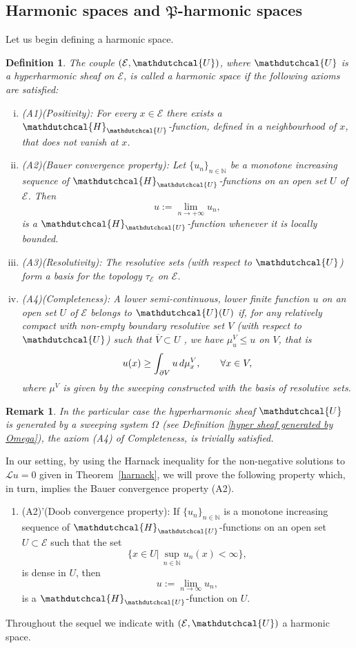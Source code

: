 \documentclass{amsart}
\newtheorem{defn}[thm]{Definition}
\newtheorem{rem}[thm]{Remark}
\numberwithin{equation}{section}
\def \Lc{{\mathcal{L}}}
\def \Hd{{\mathdutchcal{H}}}
\def \Ec{{\mathcal{E}}}
\def \Ud{{\mathdutchcal{U}}}
\begin{document}
{\subsection{Harmonic spaces and $\mathfrak{P}$-harmonic spaces}
Let us begin defining a harmonic space.
\begin{defn}
	\label{harmonic space}
The couple $(\Ec,\Ud)$, where $\Ud$ is a hyperharmonic sheaf on $\Ec$, is called a \textup{harmonic space} if the following axioms are satisfied:
\begin{enumerate}[(i)]
\item {\rm (A1)(Positivity):} For every $x\in \Ec$ there exists a $\Hd_{\Ud}$-function, defined in a neighbourhood of $x$, that does not vanish at $x$.
\item {\rm (A2)(Bauer convergence property):} Let $\{u_n\}_{n\in \mathbb{N}}$ be a monotone increasing sequence of $\Hd_{\Ud}$-functions on an open set $U$ of $\Ec$. Then
$$
u:=\lim_{n\rightarrow +\infty}u_n, 
$$
is a $\Hd_{\Ud}$-function whenever it is locally bounded.
\item {\rm (A3)(Resolutivity):} The resolutive sets (with respect to $\Ud$) form a basis for the topology $\tau_{\Ec}$ on $\Ec$.
\item {\rm (A4)(Completeness):} A lower semi-continuous, lower finite function $u$ on an open set $U$ of $\Ec$ belongs to $\Ud(U)$ if, for any relatively compact with non-empty boundary resolutive set $V$ (with respect to $\Ud$) such that $\overline{V} \subset U$ , we have $\mu^V_u \leq u$ on $V$, that is
$$
u(x) \geq \int_{\partial V}u \, {\rm d}\mu^V_x, \qquad \forall x \in V,
$$
where $\mu^V$ is given by the sweeping constructed with the basis of resolutive sets.
\end{enumerate}
\end{defn}

\begin{rem}{\rm 
In the particular case the hyperharmonic sheaf $\Ud$ is generated by a sweeping system $\Omega$ (see Definition \textup{\ref{hyper sheaf generated by Omega}}), the axiom \textup{{\rm (A4)}} of Completeness, is trivially satisfied. }
\end{rem}

In our setting, by using the Harnack inequality for the non-negative solutions to $\Lc u = 0$ given in Theorem~\ref{harnack}, we will prove the following property which, in turn, implies the Bauer convergence property {\rm (A2)}.
\begin{enumerate}
\item[\it (iv)] {\rm (A2)'(Doob convergence property):} If $\{u_n\}_{n \in \mathbb{N}}$ is a monotone increasing sequence of $\Hd_{\Ud}$-functions on an open set $U \subset \Ec$ such that the set
$$
\biggl\{ x \in U | \, \sup_{n \in \mathbb{N}}u_n (x) < \infty \biggl\},
$$
is dense in $U$, then 
$$
u := \lim_{n \rightarrow \infty} u_n,
$$
is a $\Hd_{\Ud}$-function on $U$.
\end{enumerate}
Throughout the sequel we indicate with $(\Ec,\Ud)$ a harmonic space. 

}
\end{document}
